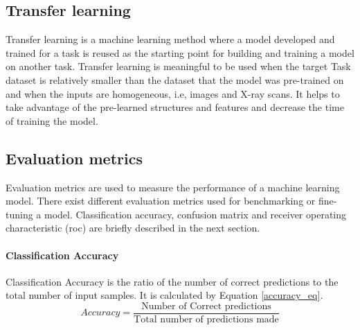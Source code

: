 \subsection{Transfer learning}
Transfer learning is a machine learning method where a model developed and trained for a task is reused as the starting point for building and training a model on another task. Transfer learning is meaningful to be used when the target Task dataset is relatively smaller than the dataset that the model was pre-trained on and when the inputs are homogeneous, i.e, images and X-ray scans. It helps to take advantage of the pre-learned structures and features and decrease the time of training the model.
\subsection{Evaluation metrics}
Evaluation metrics are used to measure the performance of a machine learning model. There exist different evaluation metrics used for benchmarking or fine-tuning a model. Classification accuracy, confusion matrix and receiver operating characteristic (\acs{roc}) are briefly described in the next section.
\paragraph{Classification Accuracy}
Classification Accuracy is the ratio of the number of correct predictions to the total number of input samples. It is calculated by Equation \ref{accuracy_eq}.
\begin{equation}
Accuracy =\frac{\textrm{Number of Correct predictions}}{\textrm{Total number of predictions made}}
\label{accuracy_eq}
\end{equation}
